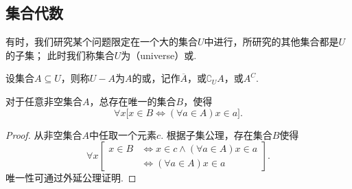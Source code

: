 \subsection{集合代数}
\begin{definition}[全集、补集]
有时，我们研究某个问题限定在一个大的集合\(U\)中进行，所研究的其他集合都是\(U\)的子集；
此时我们称集合\(U\)为（universe）或.

设集合\(A \subseteq U\)，则称\(U-A\)为\(A\)的或，记作\(\overline{A}\)，或\(\complement_U A\)，或\(A^C\).
\end{definition}

\begin{theorem}
对于任意非空集合\(A\)，总存在唯一的集合\(B\)，使得\[
\forall x \bigl[
	x \in B \iff (\forall a \in A) x \in a
\bigr].
\]
\begin{proof}
从非空集合\(A\)中任取一个元素\(c\).
根据子集公理，存在集合\(B\)使得\[
\forall x \left[
	\begin{array}{rl}
	x \in B &\iff x \in c \land (\forall a \in A) x \in a \\
		&\iff (\forall a \in A) x \in a
	\end{array}
\right].
\]唯一性可通过外延公理证明.
\end{proof}
\end{theorem}


